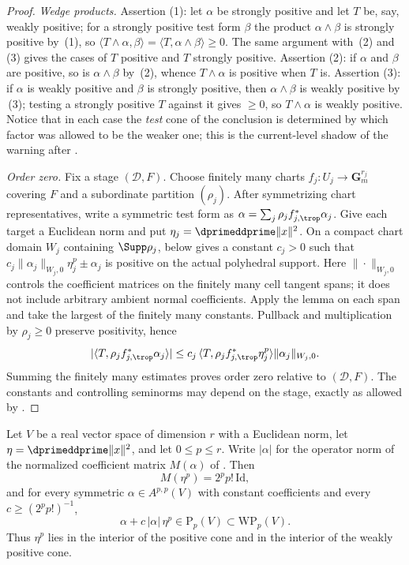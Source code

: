 \begin{proof}
\emph{Wedge products.}  Assertion (1): let $\alpha$ be strongly positive and
let $T$ be, say, weakly positive; for a strongly positive test form $\beta$
the product $\alpha\wedge\beta$ is strongly positive by
\,(1), so
$\langle T\wedge\alpha,\beta\rangle=\langle T,\alpha\wedge\beta\rangle\ge0$.
The same argument with \,(2) and (3)
gives the cases of $T$ positive and $T$ strongly positive.
Assertion (2): if $\alpha$ and $\beta$ are positive, so is
$\alpha\wedge\beta$ by \,(2), whence
$T\wedge\alpha$ is positive when $T$ is.  Assertion (3): if $\alpha$ is
weakly positive and $\beta$ is strongly positive, then $\alpha\wedge\beta$ is
weakly positive by \,(3); testing a
strongly positive $T$ against it gives $\ge0$, so $T\wedge\alpha$ is weakly
positive.  Notice that in each case the \emph{test} cone of the conclusion is
determined by which factor was allowed to be the weaker one; this is the
current-level shadow of the warning after
.

\emph{Order zero.}  Fix a stage $(\mathscr D,F)$.  Choose finitely many
charts $f_j:U_j\to\mathbf G_m^{r_j}$ covering $F$ and a subordinate
partition $(\rho_j)$.  After symmetrizing chart representatives, write a
symmetric test form as
$\alpha=\sum_j\rho_j f_{j,\trop}^*\alpha_j$.  Give each target a Euclidean
norm and put
$\eta_j=\dprimeddprime\|x\|^2$.  On a compact chart domain $W_j$ containing
$\Supp\rho_j$,  below gives a constant $c_j>0$
such that
$c_j\|\alpha_j\|_{W_j,0}\eta_j^p\pm\alpha_j$ is positive on the
actual polyhedral support. Here $\|\cdot\|_{W_j,0}$ controls the
coefficient matrices on the finitely many cell tangent spans; it does
not include arbitrary ambient normal coefficients. Apply the lemma
on each span and take the largest of the finitely many constants.  Pullback and multiplication by
$\rho_j\ge0$ preserve positivity, hence
\[
 |\langle T,\rho_j f_{j,\trop}^*\alpha_j\rangle|
 \le c_j\,\langle T,\rho_j f_{j,\trop}^*\eta_j^p\rangle
       \|\alpha_j\|_{W_j,0}.
\]
Summing the finitely many estimates proves order zero relative to
$(\mathscr D,F)$.  The constants and controlling seminorms may depend on the
stage, exactly as allowed by .
\end{proof}

\begin{lemma}
\label{lem:ch14-eta-dominates}
Let $V$ be a real vector space of dimension $r$ with a Euclidean norm, let
$\eta=\dprimeddprime\|x\|^2$, and let $0\le p\le r$.  Write $|\alpha|$ for
the operator norm of the normalized coefficient matrix $M(\alpha)$ of
.  Then
\[
 M(\eta^{p})=2^{p}p!\,\mathrm{Id},
\]
and for every symmetric $\alpha\in A^{p,p}(V)$ with constant coefficients and
every $c\ge(2^pp!)^{-1}$,
\[
 \alpha+c\,|\alpha|\,\eta^{p}\in\mathrm{P}_p(V)\subset\mathrm{WP}_p(V).
\]
Thus $\eta^p$ lies in the interior of the positive cone and in the interior
of the weakly positive cone.
\end{lemma}


